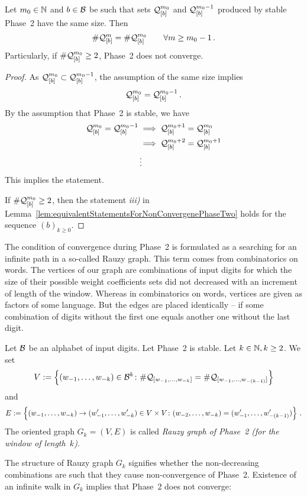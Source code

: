 \begin{thm}
\label{thm:bbbCondition}
Let $m_0 \in \NN$ and $b\in\B$ be such that sets $\Qb{m_0}$ and $\Qb{m_0-1}$ produced by stable Phase~2 have the same size. Then
$$
    \#\Qb{m} = \#\Qb{m_0} \qquad \forall m\geq m_0-1\,.
$$ 
Particularly, if $\#\Qb{m_0}\geq 2$, Phase~2 does not converge.
\end{thm}
\begin{proof}
As $\Qb{m_0} \subset \Qb{m_0-1}$, the assumption of the same size implies
$$
    \Qb{m_0} = \Qb{m_0-1}\,.
$$
By the assumption that Phase~2 is stable, we have
\begin{align*}
 \Qb{m_0} = \Qb{m_0-1} &\implies  \Qb{m_0+1} = \Qb{m_0} \\
 						&\implies  \Qb{m_0+2} = \Qb{m_0+1} \\
 						&\vdots
\end{align*}
This implies the statement.

If $\#\Qb{m_0}\geq 2$, then the statement \textit{iii)} in Lemma~\ref{lem:equivalentStatementsForNonConvergenePhaseTwo} holds for the sequence $(b)_{k\geq 0}$.
\end{proof}



The condition of convergence during Phase~2 is formulated as a searching for an infinite path in a so-called Rauzy graph. This term comes from combinatorics on words. The vertices of our graph are combinations of input digits for which the size of their possible weight coefficients sets did not decreased with an increment of length of the window. Whereas in combinatorics on words, vertices are given as factors of some language. But the edges are placed identically -- if some combination of digits without the first one equals another one without the last digit.
\begin{defn}
Let $\B$ be an alphabet of input digits. Let Phase~2 is stable. Let $k\in\NN, k\geq 2$. We set
$$
V:=\left\{\tuple{1}{k}\in\B^k \colon \#\Qw{1}{k}=\#\Qw{1}{(k-1)}\right\}
$$
and
$$
E:=\left\{\tuple{1}{k}\rightarrow\tuple[w']{1}{k}\in V\times V \colon \tuple{2}{k}=\tuple[w']{1}{(k-1)}\right\}\,.
$$
The oriented graph $G_k=(V,E)$ is called \emph{Rauzy graph of Phase~2 (for the window of length~$k$)}.
\end{defn}

The structure of Rauzy graph $G_k$ signifies whether the non-decreasing combinations are such that they cause non-convergence of Phase~2. Existence of an infinite walk in $G_k$ implies that Phase~2 does not converge:

